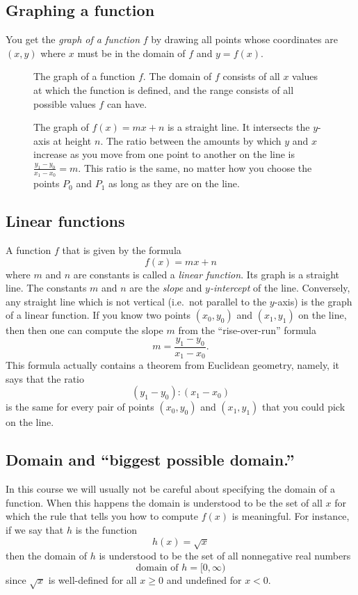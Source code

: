 \subsection{Graphing a function}
You get the \emph{graph of a function} $f$ by drawing all points whose
coordinates are $(x,y)$ where $x$ must be in the domain of $f$ and $y = f(x)$.
\begin{figure}[h]
  \centering
  
  \caption{The graph of a function $f$. The domain of $f$ consists
    of all $x$ values at which the function is defined, and the range consists
    of all possible values $f$ can have.}
  \label{fig:01graphOFf}
\end{figure}

\begin{figure}[t]
  \centering
  
  \caption{The graph of $f(x) = mx+n$ is a straight line.
    It intersects the $y$-axis at height $n$.
    The ratio between the amounts by which $y$ and $x$ increase as you
    move from one point to another on the line is
    $\frac{y_1-y_0}{x_1-x_0} = m$.  This ratio is the same, no matter
    how you choose the points $P_0$ and $P_1$ as long as they are on
    the line.}\label{fig:01line}
\end{figure}
\subsection{Linear functions}
A function $f$ that is given by the formula 
\[
f(x) = mx + n
\]
where $m$ and $n$ are constants is called a \emph{linear function}.  Its graph
is a straight line.  The constants $m$ and $n$ are the \emph{slope} and
\emph{$y$-intercept} of the line.  Conversely, any straight line which is not
vertical (i.e.\ not parallel to the $y$-axis) is the graph of a linear function.
If you know two points $(x_0, y_0)$ and $(x_1, y_1)$ on the line, then then one
can compute the slope $m$ from the ``rise-over-run'' formula
\[
m = \frac{y_1-y_0}{x_1-x_0}.
\]
This formula actually contains a theorem from Euclidean geometry,
namely, it says that the ratio
\[
(y_1-y_0):(x_1-x_0)
\]
is the same for every pair of points $(x_0, y_0)$ and $(x_1, y_1)$
that you could pick on the line.


\subsection{Domain and ``biggest possible domain.'' }
In this course we will usually not be careful about specifying the
domain of a function.  When this happens the domain is understood to
be the set of all $x$ for which the rule that tells you how to
compute $f(x)$ is meaningful.  For instance, if we say that $h$ is the
function 
\[
h(x) = \sqrt x
\]
then the domain of $h$ is understood to be the set of all nonnegative real
numbers
\[
\text{domain of $h$} = [0, \infty)
\]
since $\sqrt x$ is well-defined for all $x\geq 0$ and undefined for $x<0$.

